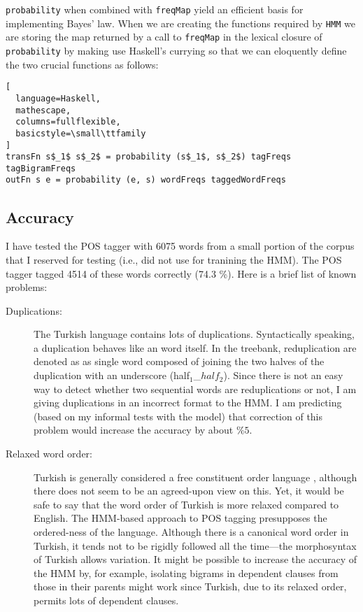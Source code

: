 \documentclass{article}
\begin{document}
\texttt{probability} when combined with \texttt{freqMap} yield an efficient
basis for implementing Bayes' law. When we are creating the functions
required by \texttt{HMM} we are storing the map returned by a call to
\texttt{freqMap} in the lexical closure of \texttt{probability} by making use
Haskell's currying so that we can eloquently define the two crucial functions
as follows:
\begin{lstlisting}[
  language=Haskell,
  mathescape,
  columns=fullflexible,
  basicstyle=\small\ttfamily
]
transFn s$_1$ s$_2$ = probability (s$_1$, s$_2$) tagFreqs tagBigramFreqs
outFn s e = probability (e, s) wordFreqs taggedWordFreqs
\end{lstlisting}

\subsection{Accuracy}
\label{subsec:accuracy}

I have tested the POS tagger with 6075 words from a small portion of the corpus
that I reserved for testing (i.e., did not use for tranining the HMM). The POS
tagger tagged 4514 of these words correctly (74.3 \%). Here is a brief list of
known problems:
\begin{description}
  \item[Duplications:] The Turkish language contains lots of duplications.
  Syntactically speaking, a duplication behaves like an word itself. In the
  treebank, reduplication are denoted as as single word composed of joining the
  two halves of the duplication with an underscore (half$_1$\_$half_2$). Since
  there is not an easy way to detect whether two sequential words are
  reduplications or not, I am giving duplications in an incorrect format to the
  HMM. I am predicting (based on my informal tests with the model) that
  correction of this problem would increase the accuracy by about $\%5$.
  \item[Relaxed word order:] Turkish is generally considered a free constituent
  order language \citep{erguvanli, dincer2008suffix}, although there does not seem to be an
  agreed-upon view on this. Yet, it would be safe to say that the word order of
  Turkish is more relaxed compared to English. The HMM-based approach to POS
  tagging presupposes the ordered-ness of the language. Although there is a
  canonical word order in Turkish, it tends not to be rigidly followed all the
  time---the morphosyntax of Turkish allows variation. It might be possible to
  increase the accuracy of the HMM by, for example, isolating bigrams in
  dependent clauses from those in their parents might work since Turkish, due to
  its relaxed order, permits lots of dependent clauses.
\end{description}
\end{document}

